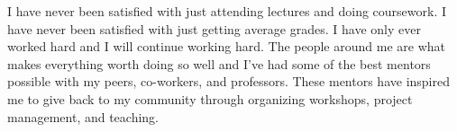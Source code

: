 

\begin{cvparagraph}

I have never been satisfied with just attending lectures and doing coursework. I have never been satisfied with just getting average grades. I have only ever worked hard and I will continue working hard. The people around me are what makes everything worth doing so well and I've had some of the best mentors possible with my peers, co-workers, and professors. These mentors have inspired me to give back to my community through organizing workshops, project management, and teaching.
\end{cvparagraph}
